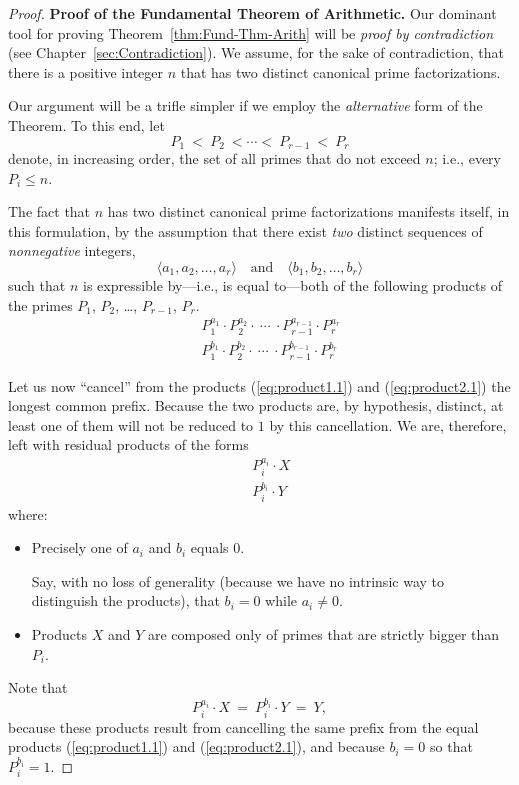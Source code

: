 \begin{proof}
{\bf Proof of the Fundamental Theorem of Arithmetic.}
%
Our dominant tool for proving Theorem~\ref{thm:Fund-Thm-Arith} will be
{\em proof by contradiction} (see Chapter~\ref{sec:Contradiction}).
We assume, for the sake of contradiction, that there is a positive
integer $n$ that has two distinct canonical prime factorizations.

Our argument will be a trifle simpler if we employ the {\em alternative} 
form of the Theorem.  To this end, let
\[ P_1 \ < \ P_2 \ < \cdots < \ P_{r-1} \ < \ P_r \]
denote, in increasing order, the set of all primes that do not exceed
$n$; i.e., every $P_i \leq n$.

The fact that $n$ has two distinct canonical prime factorizations
manifests itself, in this formulation, by the assumption that there
exist {\em two} distinct sequences of {\em nonnegative} integers, 
\[ \langle a_1, a_2, \ldots, a_r \rangle \ \ \ \mbox{ and } \ \ \
\langle b_1, b_2, \ldots, b_r \rangle 
\]
such that $n$ is expressible by---i.e., is equal to---both of the
following products of the primes $P_1$, $P_2$, \ldots, $P_{r-1}$, $P_r$.
\begin{eqnarray}
 & & 
\label{eq:product1.1}
P_1^{a_1} \cdot P_2^{a_2} \cdot \ \cdots \ \cdot P_{r-1}^{a_{r-1}}
\cdot P_r^{a_r} \\
 & &
\label{eq:product2.1}
P_1^{b_1} \cdot P_2^{b_2} \cdot \ \cdots \ \cdot P_{r-1}^{b_{r-1}}
\cdot P_r^{b_r}
\end{eqnarray}

Let us now ``cancel'' from the products (\ref{eq:product1.1}) and
(\ref{eq:product2.1}) the longest common prefix.  Because the two
products are, by hypothesis, distinct, at least one of them will not
be reduced to $1$ by this cancellation.  We are, therefore, left with
residual products of the forms
\begin{eqnarray}
 & &
\label{eq:product1.2}
P_i^{a_i} \cdot X \\
 & &
\label{eq:product2.2}
P_i^{b_i} \cdot Y
\end{eqnarray}
where:
\begin{itemize}
\item
Precisely one of $a_i$ and $b_i$ equals $0$.

Say, with no loss of generality (because we have no intrinsic way to
distinguish the products), that $b_i =0$ while $a_i \neq 0$.

\item
Products $X$ and $Y$ are composed only of primes that are strictly
bigger than $P_i$.
\end{itemize}
Note that 
\[ P_i^{a_i} \cdot X \ = \ P_i^{b_i} \cdot Y \ = \ Y, \]
because these products result from cancelling the same prefix from the
equal products (\ref{eq:product1.1}) and (\ref{eq:product2.1}), and
because $b_i =0$ so that $P_i^{b_i} = 1$.


\end{proof}
